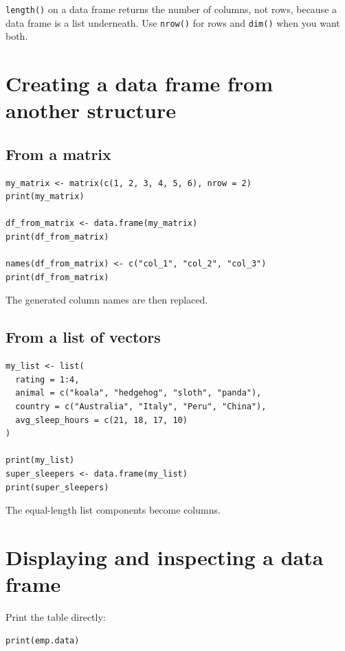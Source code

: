 \begin{pitfall}
\texttt{length()} on a data frame returns the number of columns, not rows,
because a data frame is a list underneath. Use \texttt{nrow()} for rows and
\texttt{dim()} when you want both.
\end{pitfall}

\section{Creating a data frame from another structure}

\subsection{From a matrix}

\begin{lstlisting}[style=dsr]
my_matrix <- matrix(c(1, 2, 3, 4, 5, 6), nrow = 2)
print(my_matrix)

df_from_matrix <- data.frame(my_matrix)
print(df_from_matrix)

names(df_from_matrix) <- c("col_1", "col_2", "col_3")
print(df_from_matrix)
\end{lstlisting}

The generated column names are then replaced.

\subsection{From a list of vectors}

\begin{lstlisting}[style=dsr]
my_list <- list(
  rating = 1:4,
  animal = c("koala", "hedgehog", "sloth", "panda"),
  country = c("Australia", "Italy", "Peru", "China"),
  avg_sleep_hours = c(21, 18, 17, 10)
)

print(my_list)
super_sleepers <- data.frame(my_list)
print(super_sleepers)
\end{lstlisting}

The equal-length list components become columns.

\section{Displaying and inspecting a data frame}

Print the table directly:

\begin{lstlisting}[style=dsr]
print(emp.data)
\end{lstlisting}

